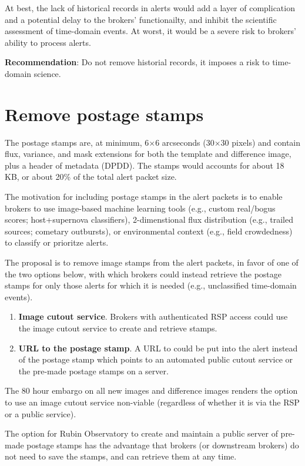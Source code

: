 \documentclass[DM,authoryear,toc]{lsstdoc}
\begin{document}
At best, the lack of historical records in alerts would add a layer of complication and a potential delay to the brokers' functionailty, and inhibit the scientific assessment of time-domain events.
At worst, it would be a severe risk to brokers' ability to process alerts.

\textbf{Recommendation}: Do not remove historial records, it imposes a risk to time-domain science.


\section{Remove postage stamps}\label{sec:stamps}

The postage stamps are, at minimum, 6$\times$6 arcseconds (30$\times$30 pixels) and contain flux, variance, and mask extensions for both the template and difference image, plus a header of metadata (DPDD).
The stamps would accounts for about 18 KB, or about 20\% of the total alert packet size.

The motivation for including postage stamps in the alert packets is to enable brokers to use image-based machine learning tools (e.g., custom real/bogus scores; host+supernova classifiers), 2-dimenstional flux distribution (e.g., trailed sources; cometary outbursts), or environmental context (e.g., field crowdedness) to classify or prioritze alerts.

The proposal is to remove image stamps from the alert packets, in favor of one of the two options below, with which brokers could instead retrieve the postage stamps for only those alerts for which it is needed (e.g., unclassified time-domain events).

\begin{enumerate}
\item \textbf{Image cutout service}. Brokers with authenticated RSP access could use the image cutout service to create and retrieve stamps.
\item \textbf{URL to the postage stamp}. A URL to could be put into the alert instead of the postage stamp which points to an automated public cutout service or the pre-made postage stamps on a server.
\end{enumerate}

The 80 hour embargo on all new images and difference images renders the option to use an image cutout service non-viable (regardless of whether it is via the RSP or a public service).

The option for Rubin Observatory to create and maintain a public server of pre-made postage stamps has the advantage that brokers (or downstream brokers) do not need to save the stamps, and can retrieve them at any time.
\end{document}
